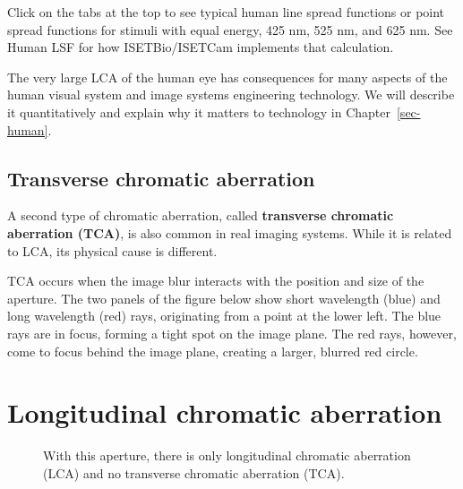 \documentclass[
  letterpaper,
]{book}
\begin{document}
Click on the tabs at the top to see typical human line spread functions
or point spread functions for stimuli with equal energy, 425 nm, 525 nm,
and 625 nm. See Human LSF for how ISETBio/ISETCam implements that
calculation.

The very large LCA of the human eye has consequences for many aspects of
the human visual system and image systems engineering technology. We
will describe it quantitatively and explain why it matters to technology
in Chapter~\ref{sec-human}.

\subsection{Transverse chromatic
aberration}\label{transverse-chromatic-aberration}

A second type of chromatic aberration, called \textbf{transverse
chromatic aberration (TCA)}, is also common in real imaging systems.
While it is related to LCA, its physical cause is different.

TCA occurs when the image blur interacts with the position and size of
the aperture. The two panels of the figure below show short wavelength
(blue) and long wavelength (red) rays, originating from a point at the
lower left. The blue rays are in focus, forming a tight spot on the
image plane. The red rays, however, come to focus behind the image
plane, creating a larger, blurred red circle.

\section{Longitudinal chromatic aberration}

\begin{figure}


\caption{\label{fig-optics-notransverse}With this aperture, there is
only longitudinal chromatic aberration (LCA) and no transverse chromatic
aberration (TCA).}

\end{figure}%
\end{document}
